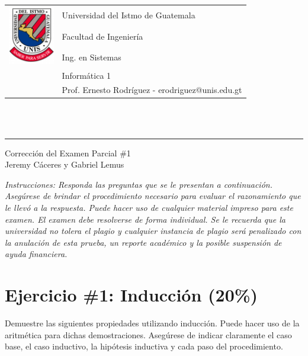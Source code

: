 \documentclass[11pt,letterpaper]{article}
\begin{document}

\begin{tabular}{l l}
\multirow{3}{*}{\includegraphics[width=2cm]{../../recursos/logo}} 
 & \Large Universidad del Istmo de Guatemala \\
 & \Large Facultad de Ingeniería \\
 & \Large Ing. en Sistemas \\
 & \Large Informática 1 \\
 & \Large Prof. Ernesto Rodríguez - erodriguez@unis.edu.gt \\
\end{tabular}
\\\\

\begin{center}
	\hrule
	\vspace{0.5cm}
	\huge{Corrección del Examen Parcial \#1} \\
	\vspace{0.1cm}
    \Large{Jeremy Cáceres y Gabriel Lemus}\\
    \vspace{0.05cm}
    \hrulefill
\end{center}
\vspace{0.05cm}

\emph{Instrucciones: Responda las preguntas que se le presentan a continuación. Asegúrese de brindar el procedimiento necesario para evaluar el razonamiento que le llevó a la respuesta. Puede hacer uso de cualquier material impreso para este examen. El examen debe resolverse de forma individual. Se le recuerda que la universidad no tolera el plagio y cualquier instancia de plagio será penalizado con la anulación de esta prueba, un reporte académico y la posible suspensión de ayuda financiera.}
\vspace{0.1cm}

\section*{Ejercicio \#1: Inducción (20\%)}
\noindent Demuestre las siguientes propiedades utilizando inducción. Puede hacer uso de la aritmética para dichas demostraciones. Asegúrese de indicar claramente el caso base, el caso inductivo, la hipótesis inductiva y cada paso del procedimiento.
\end{document}
